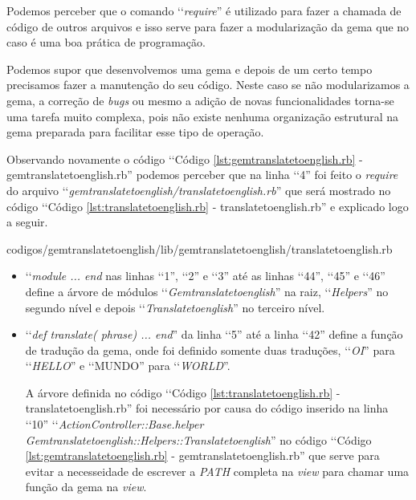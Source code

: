 Podemos perceber que o comando ‘‘\emph{require}'' é utilizado para fazer a chamada de código de outros 
arquivos e isso serve para fazer a modularização da gema que no caso é uma boa prática de programação.

Podemos supor que desenvolvemos uma gema e depois de um certo tempo precisamos fazer a manutenção do 
seu código. Neste caso se não modularizamos a gema, a correção de \emph{bugs} ou mesmo a adição de 
novas funcionalidades torna-se uma tarefa muito complexa, pois não existe nenhuma organização 
estrutural na gema preparada para facilitar esse tipo de operação. 

Observando novamente o código ‘‘Código \ref{lst:gemtranslatetoenglish.rb} - gemtranslatetoenglish.rb'' 
podemos perceber que na linha ‘‘4'' foi feito o \emph{require} do arquivo 
‘‘\emph{gemtranslatetoenglish/translatetoenglish.rb}'' que será mostrado no código ‘‘Código 
\ref{lst:translatetoenglish.rb} - translatetoenglish.rb'' e explicado logo a seguir.


{codigos/gemtranslatetoenglish/lib/gemtranslatetoenglish/translatetoenglish.rb}

\begin{itemize}

  \item ‘‘\emph{module ... end} nas linhas ‘‘1'', ‘‘2'' e ‘‘3'' até as linhas ‘‘44'', ‘‘45'' e ‘‘46'' 
  define a árvore de módulos ‘‘\emph{Gemtranslatetoenglish}'' na raiz, ‘‘\emph{Helpers}'' no segundo 
  nível e depois ‘‘\emph{Translatetoenglish}'' no terceiro nível.
  \item ‘‘\emph{def translate( phrase) ... end}'' da linha ‘‘5'' até a linha ‘‘42'' define a função de 
  tradução da gema, onde foi definido somente duas traduções, ‘‘\emph{OI}'' para ‘‘\emph{HELLO}'' 
  e ‘‘MUNDO'' para ‘‘\emph{WORLD}''.
  
  A árvore definida no código ‘‘Código \ref{lst:translatetoenglish.rb} - translatetoenglish.rb'' foi 
  necessário por causa do código inserido na linha ‘‘10'' 
  ‘‘\emph{ActionController::Base.helper Gemtranslatetoenglish::Helpers::Translatetoenglish}''
  no código ‘‘Código \ref{lst:gemtranslatetoenglish.rb} - gemtranslatetoenglish.rb'' que serve para 
  evitar a necesseidade de escrever a \emph{PATH} completa na \emph{view} para chamar uma função 
  da gema na \emph{view}.
  
\end{itemize}

